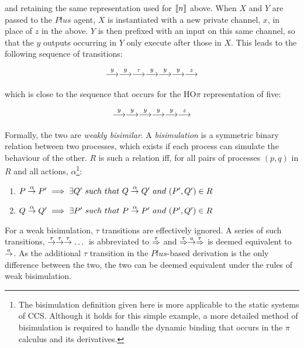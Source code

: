 \noindent and retaining the same representation used for $[\hspace{-0.3ex}[ n
]\hspace{-0.3ex}]$ above.  When $X$ and $Y$ are passed to the $Plus$ agent, $X$ is
instantiated with a new private channel, $x$, in place of $z$ in the
above.  $Y$ is then prefixed with an input on this same channel, so
that the $y$ outputs occurring in $Y$ only execute after those in $X$.
This leads to the following sequence of transitions:

\begin{equation}
  \stackrel{y}{\longrightarrow} \stackrel{y}{\longrightarrow} \stackrel{\tau}{\longrightarrow} \stackrel{y}{\longrightarrow} \stackrel{y}{\longrightarrow} \stackrel{y}{\longrightarrow} \stackrel{z}{\longrightarrow}
\end{equation}

\noindent which is close to the sequence that occurs for the HO$\pi$
representation of five:

\begin{equation}
  \stackrel{y}{\longrightarrow} \stackrel{y}{\longrightarrow} \stackrel{y}{\longrightarrow} \stackrel{y}{\longrightarrow} \stackrel{y}{\longrightarrow} \stackrel{z}{\longrightarrow}
\end{equation}

Formally, the two are \emph{weakly bisimilar}.  A \emph{bisimulation} is
a symmetric binary relation between two processes, which exists if each
process can simulate the behaviour of the other.  $R$ is such a relation
iff, for all pairs of processes $(p,q)$ in $R$ and all actions,
$\alpha$\footnote{The bisimulation definition given here is more
applicable to the static systems of CCS.  Although it holds for this
simple example, a more detailed method of bisimulation is required to
handle the dynamic binding that occurs in the $\pi$ calculus and its
derivatives.}:

\begin{enumerate}
\item $P \stackrel{\alpha}{\rightarrow} P^\prime \implies \exists Q^\prime\ such\
  that\ Q \stackrel{\alpha}{\rightarrow} Q^\prime\ and\ (P^\prime,Q^\prime) \in R$
\item $Q \stackrel{\alpha}{\rightarrow} Q^\prime \implies \exists P^\prime\ such\
  that\ P \stackrel{\alpha}{\rightarrow} P^\prime\ and\ (P^\prime,Q^\prime) \in R$
\end{enumerate}

For a weak bisimulation, $\tau$ transitions are effectively ignored.
A series of such transitions,
$\stackrel{\tau}{\rightarrow}\stackrel{\tau}{\rightarrow}\stackrel{\tau}{\rightarrow}\dots$ is abbreviated to
$\stackrel{\tau}{\Rightarrow}$ and $\stackrel{\tau}{\Rightarrow} \stackrel{a}{\rightarrow}
\stackrel{\tau}{\Rightarrow}$ is deemed equivalent to $\stackrel{a}{\rightarrow}$.  As the
additional $\tau$ transition in the $Plus$-based derivation is the
only difference between the two, the two can be deemed equivalent
under the rules of weak bisimulation.

